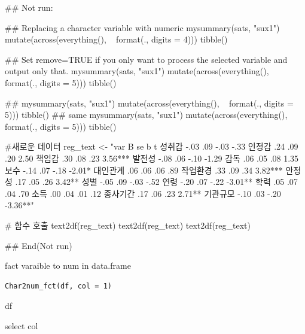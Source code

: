 \documentclass[a4paper]{book}
\begin{document}
\begin{Examples}
\begin{ExampleCode}

\#\# Not run: 

## Replacing a character variable with numeric
mysummary(sats, "sux1") %
    mutate(across(everything(), ~ format(., digits = 4))) %
    tibble() %


## Set remove=TRUE if you only want to process the selected variable and output only that.
  mysummary(sats, "sux1") %
  mutate(across(everything(), ~ format(., digits = 5))) %
    tibble() %

##
mysummary(sats, "sux1") %
  mutate(across(everything(), ~ format(., digits = 5))) %
    tibble() %
## same
  mysummary(sats, "sux1") %
     mutate(across(everything(), ~ format(., digits = 5))) %
     tibble() %


#새로운 데이터
reg_text <- "var B se b t
성취감 -.03 .09 -.03 -.33
인정감 .24 .09 .20 2.50
책임감 .30 .08 .23 3.56***
발전성 -.08 .06 -.10 -1.29
감독 .06 .05 .08 1.35
보수 -.14 .07 -.18 -2.01*
대인관계 .06 .06 .06 .89
작업환경 .33 .09 .34 3.82***
안정성 .17 .05 .26 3.42**
성별 -.05 .09 -.03 -.52
연령 -.20 .07 -.22 -3.01**
학력 .05 .07 .04 .70
소득 .00 .04 .01 .12
종사기간 .17 .06 .23 2.71**
기관규모 -.10 .03 -.20 -3.36**"

# 함수 호출
text2df(reg_text) %
text2df(reg_text)%
text2df(reg_text)%

## End(Not run)

\end{ExampleCode}
\end{Examples}
%
\begin{Description}
fact varaible to num  in data.frame
\end{Description}
%
\begin{Usage}
\begin{verbatim}
Char2num_fct(df, col = 1)
\end{verbatim}
\end{Usage}
%
\begin{Arguments}
\begin{ldescription}
\item[\code{df}] df

\item[\code{col}] select col
\end{ldescription}
\end{Arguments}
\end{document}
